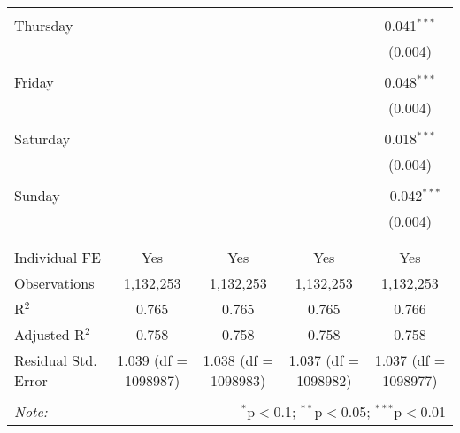 \documentclass[
]{article}
\begin{document}
\begin{table}[!htbp]
{\begin{tabular}{@{\extracolsep{5pt}}lcccc}
  & & & & \\ 
 Thursday &  &  &  & 0.041$^{***}$ \\ 
  &  &  &  & (0.004) \\ 
  & & & & \\ 
 Friday &  &  &  & 0.048$^{***}$ \\ 
  &  &  &  & (0.004) \\ 
  & & & & \\ 
 Saturday &  &  &  & 0.018$^{***}$ \\ 
  &  &  &  & (0.004) \\ 
  & & & & \\ 
 Sunday &  &  &  & $-$0.042$^{***}$ \\ 
  &  &  &  & (0.004) \\ 
  & & & & \\ 
\hline \\[-1.8ex] 
Individual FE & Yes & Yes & Yes & Yes \\ 
Observations & 1,132,253 & 1,132,253 & 1,132,253 & 1,132,253 \\ 
R$^{2}$ & 0.765 & 0.765 & 0.765 & 0.766 \\ 
Adjusted R$^{2}$ & 0.758 & 0.758 & 0.758 & 0.758 \\ 
Residual Std. Error & 1.039 (df = 1098987) & 1.038 (df = 1098983) & 1.037 (df = 1098982) & 1.037 (df = 1098977) \\ 
\hline 
\hline \\[-1.8ex] 
\textit{Note:}  & \multicolumn{4}{r}{$^{*}$p$<$0.1; $^{**}$p$<$0.05; $^{***}$p$<$0.01} \\ 
\end{tabular}
} 
\end{table} 
\newpage
\end{document}
